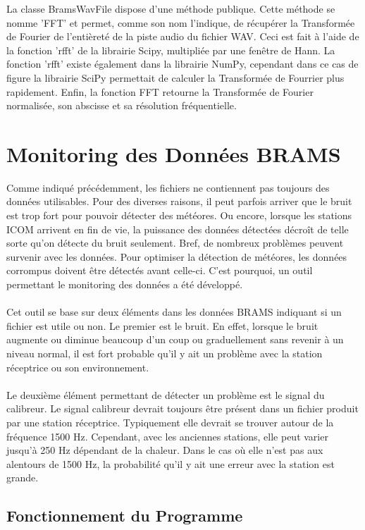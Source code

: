 \documentclass[11pt]{article}
\begin{document}
La classe BramsWavFile dispose d'une méthode publique.
Cette méthode se nomme 'FFT' et permet, comme son nom l'indique, de récupérer la Transformée de Fourier de l'entièreté de la piste audio du fichier WAV.
Ceci est fait à l'aide de la fonction 'rfft' de la librairie Scipy, multipliée par une fenêtre de Hann.
La fonction 'rfft' existe également dans la librairie NumPy, cependant dans ce cas de figure la librairie SciPy permettait de calculer la Transformée de Fourrier plus rapidement.
Enfin, la fonction FFT retourne la Transformée de Fourier normalisée, son abscisse et sa résolution fréquentielle.

\newpage

\section{Monitoring des Données BRAMS}

Comme indiqué précédemment, les fichiers ne contiennent pas toujours des données utilisables.
Pour des diverses raisons, il peut parfois arriver que le bruit est trop fort pour pouvoir détecter des météores.
Ou encore, lorsque les stations ICOM arrivent en fin de vie, la puissance des données détectées décroît de telle sorte qu'on détecte du bruit seulement.
Bref, de nombreux problèmes peuvent survenir avec les données.
Pour optimiser la détection de météores, les données corrompus doivent être détectés avant celle-ci.
C'est pourquoi, un outil permettant le monitoring des données a été développé.\\
\\
Cet outil se base sur deux éléments dans les données BRAMS indiquant si un fichier est utile ou non.
Le premier est le bruit.
En effet, lorsque le bruit augmente ou diminue beaucoup d'un coup ou graduellement sans revenir à un niveau normal, il est fort probable qu'il y ait un problème avec la station réceptrice ou son environnement.\\
\\
Le deuxième élément permettant de détecter un problème est le signal du calibreur.
Le signal calibreur devrait toujours être présent dans un fichier produit par une station réceptrice.
Typiquement elle devrait se trouver autour de la fréquence 1500 Hz.
Cependant, avec les anciennes stations, elle peut varier jusqu'à 250 Hz dépendant de la chaleur.
Dans le cas où elle n'est pas aux alentours de 1500 Hz, la probabilité qu'il y ait une erreur avec la station est grande.

\subsection{Fonctionnement du Programme}
\end{document}
